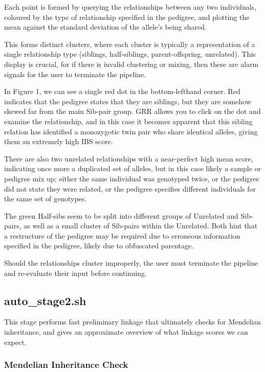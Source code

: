 Each point is formed by querying the relationships between any two individuals, coloured by the type of relationship specified in the pedigree, and plotting the mean against the standard deviation of the allele's being shared.

This forms distinct clusters, where each cluster is typically a representation of a single relationship type (siblings, half-siblings, parent-offspring, unrelated). This display is crucial, for if there is invalid clustering or mixing, then these are alarm signals for the user to terminate the pipeline.

In Figure 1, we can see a single red dot in the bottom-lefthand corner. Red indicates that the pedigree states that they are siblings, but they are somehow skewed far from the main Sib-pair group. GRR allows you to click on the dot and examine the relationship, and in this case it becomes apparent that this sibling relation has identified a monozygotic twin pair who share identical alleles, giving them an extremely high IBS score.

There are also two unrelated relationships with a near-perfect high mean score, indicating once more a duplicated set of alleles, but in this case likely a sample or pedigree mix up; either the same individual was genotyped twice, or the pedigree did not state they were related, or the pedigree specifies different individuals for the same set of genotypes.

The green Half-sibs seem to be split into different groups of Unrelated and Sib-pairs, as well as a small cluster of Sib-pairs within the Unrelated. Both hint that a restructure of the pedigree may be required due to erroneous information specified in the pedigree, likely due to obfuscated parentage.

Should the relationships cluster improperly, the user must terminate the pipeline and re-evaluate their input before continuing.


\subsection{auto\_stage2.sh}

This stage performs fast preliminary linkage that ultimately checks for Mendelian inheritance, and gives an approximate overview of what linkage scores we can expect.

\subsubsection{Mendelian Inheritance Check}

